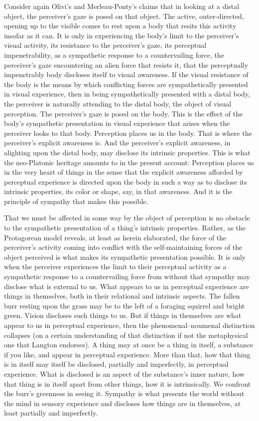Consider again Olivi's and Merleau-Ponty's claims that in looking at a distal object, the perceiver's gaze is posed on that object. The active, outer-directed, opening up to the visible comes to rest upon a body that resits this activity insofar as it can. It is only in experiencing the body's limit to the perceiver's visual activity, its resistance to the perceiver's gaze, its perceptual impenetrability, as a sympathetic response to a countervailing force, the perceiver's gaze encountering an alien force that resists it, that the perceptually impenetrably body discloses itself to visual awareness. If the visual resistance of the body is the means by which conflicting forces are sympathetically presented in visual experience, then in being sympathetically presented with a distal body, the perceiver is naturally attending to the distal body, the object of visual perception. The perceiver's gaze is posed on the body. This is the effect of the body's sympathetic presentation in visual experience that arises when the perceiver looks to that body. Perception places us in the body. That is where the perceiver's explicit awareness is. And the perceiver's explicit awareness, in alighting upon the distal body, may disclose its intrinsic properties. This is what the neo-Platonic heritage amounts to in the present account: Perception places us in the very heart of things in the sense that the explicit awareness afforded by perceptual experience is directed upon the body in such a way as to disclose its intrinsic properties, its color or shape, say, in that awareness. And it is the principle of sympathy that makes this possible.

That we must be affected in some way by the object of perception is no obstacle to the sympathetic presentation of a thing's intrinsic properties. Rather, as the Protagorean model reveals, at least as herein elaborated, the force of the perceiver's activity coming into conflict with the self-maintaining forces of the object perceived is what makes its sympathetic presentation possible. It is only when the perceiver experiences the limit to their perceptual activity as a sympathetic response to a countervailing force from without that sympathy may disclose what is external to us. What appears to us in perceptual experience are things in themselves, both in their relational and intrinsic aspects. The fallen burr resting upon the grass may be to the left of a foraging squirrel and bright green. Vision discloses such things to us. But if things in themselves are what appear to us in perceptual experience, then the phenomenal--noumenal distinction collapses (on a certain understanding of that distinction if not the metaphysical one that Langton endorses). A thing may at once be a thing in itself, a substance if you like, and appear in perceptual experience. More than that, how that thing is in itself may itself be disclosed, partially and imperfectly, in perceptual experience. What is disclosed is an aspect of the substance's inner nature, how that thing is in itself apart from other things, how it is intrinsically. We confront the burr's greenness in seeing it. Sympathy is what presents the world without the mind in sensory experience and discloses how things are in themselves, at least partially and imperfectly.


